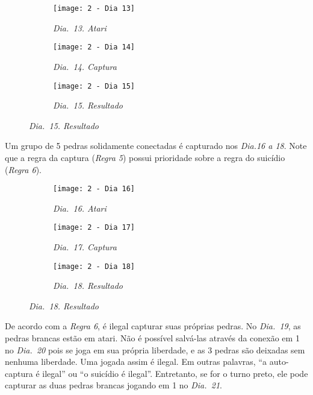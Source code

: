 \begin{figure}[h]
    \centering
    \begin{subfigure}{.3\textwidth}
        \centering
        \texttt{[image: 2 - Dia 13]}
        \captionsetup{justification=centering}
        \caption*{\emph{Dia.\@~13. Atari}}
    \end{subfigure}
    \begin{subfigure}{.3\textwidth}
        \centering
        \texttt{[image: 2 - Dia 14]}
        \captionsetup{justification=centering}
        \caption*{\emph{Dia.\@~14. Captura}}
    \end{subfigure}
    \begin{subfigure}{.3\textwidth}
        \centering
        \texttt{[image: 2 - Dia 15]}
        \captionsetup{justification=centering}
        \caption*{\emph{Dia.\@~15. Resultado}}
    \end{subfigure}
\end{figure}

Um grupo de 5 pedras solidamente conectadas é capturado nos \emph{Dia.\@ 16 a 18}. Note que a regra da captura (\emph{Regra 5}) possui prioridade sobre a regra do suicídio (\emph{Regra 6}).

\begin{figure}[h!]
    \centering
    \begin{subfigure}{.3\textwidth}
        \centering
        \texttt{[image: 2 - Dia 16]}
        \captionsetup{justification=centering}
        \caption*{\emph{Dia.\@~16. Atari}}
    \end{subfigure}
    \begin{subfigure}{.3\textwidth}
        \centering
        \texttt{[image: 2 - Dia 17]}
        \captionsetup{justification=centering}
        \caption*{\emph{Dia.\@~17. Captura}}
    \end{subfigure}
    \begin{subfigure}{.3\textwidth}
        \centering
        \texttt{[image: 2 - Dia 18]}
        \captionsetup{justification=centering}
        \caption*{\emph{Dia.\@~18. Resultado}}
    \end{subfigure}
\end{figure}

De acordo com a \emph{Regra 6}, é ilegal capturar suas próprias pedras. No \emph{Dia.\@~19}, as pedras brancas estão em atari. Não é possível salvá-las através da conexão em 1 no \emph{Dia.\@~20} pois se joga em sua própria liberdade, e as 3 pedras são deixadas sem nenhuma liberdade. Uma jogada assim é ilegal. Em outras palavras, ``a auto-captura é ilegal''  ou ``o suicídio é ilegal''. Entretanto, se for o turno preto, ele pode capturar as duas pedras brancas jogando em 1 no \emph{Dia.\@~21}.

